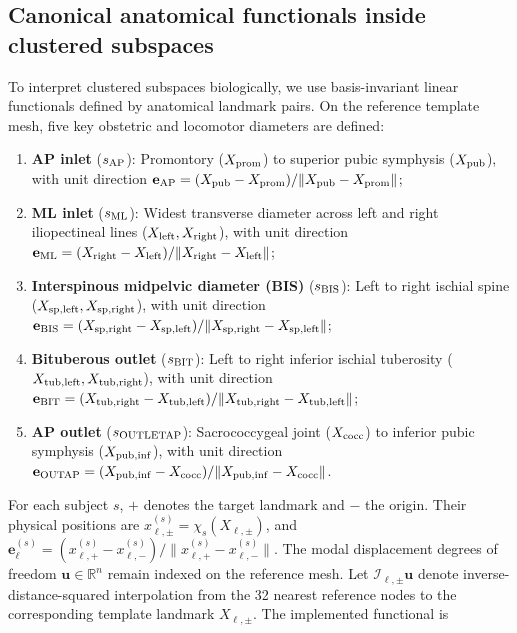 \documentclass[pdflatex,sn-basic]{sn-jnl}
\begin{document}
\subsection{Canonical anatomical functionals inside clustered subspaces}
\label{sec:canonical-methods}

To interpret clustered subspaces biologically, we use basis-invariant linear functionals defined by anatomical landmark pairs.
On the reference template mesh, five key obstetric and locomotor diameters are defined:
\begin{enumerate}[label=(\roman*)]
\item \textbf{AP inlet} ($s_{\rm AP}$): Promontory ($X_{\rm prom}$) to superior pubic symphysis ($X_{\rm pub}$), with unit direction $\mathbf e_{\rm AP} = (X_{\rm pub} - X_{\rm prom}) / \|X_{\rm pub} - X_{\rm prom}\|$;
\item \textbf{ML inlet} ($s_{\rm ML}$): Widest transverse diameter across left and right iliopectineal lines ($X_{\rm left}, X_{\rm right}$), with unit direction $\mathbf e_{\rm ML} = (X_{\rm right} - X_{\rm left}) / \|X_{\rm right} - X_{\rm left}\|$;
\item \textbf{Interspinous midpelvic diameter (BIS)} ($s_{\rm BIS}$): Left to right ischial spine ($X_{\rm sp,left}, X_{\rm sp,right}$), with unit direction $\mathbf e_{\rm BIS} = (X_{\rm sp,right} - X_{\rm sp,left}) / \|X_{\rm sp,right} - X_{\rm sp,left}\|$;
\item \textbf{Bituberous outlet} ($s_{\rm BIT}$): Left to right inferior ischial tuberosity ($X_{\rm tub,left}, X_{\rm tub,right}$), with unit direction $\mathbf e_{\rm BIT} = (X_{\rm tub,right} - X_{\rm tub,left}) / \|X_{\rm tub,right} - X_{\rm tub,left}\|$;
\item \textbf{AP outlet} ($s_{\rm OUTLETAP}$): Sacrococcygeal joint ($X_{\rm cocc}$) to inferior pubic symphysis ($X_{\rm pub,inf}$), with unit direction $\mathbf e_{\rm OUTAP} = (X_{\rm pub,inf} - X_{\rm cocc}) / \|X_{\rm pub,inf} - X_{\rm cocc}\|$.
\end{enumerate}
For each subject $s$, $+$ denotes the target landmark and $-$ the origin. Their physical positions are $x_{\ell,\pm}^{(s)}=\chi_s(X_{\ell,\pm})$, and $\mathbf e_\ell^{(s)}=(x_{\ell,+}^{(s)}-x_{\ell,-}^{(s)})/\|x_{\ell,+}^{(s)}-x_{\ell,-}^{(s)}\|$. The modal displacement degrees of freedom $\mathbf u\in\mathbb R^n$ remain indexed on the reference mesh. Let $\mathcal I_{\ell,\pm}\mathbf u$ denote inverse-distance-squared interpolation from the 32 nearest reference nodes to the corresponding template landmark $X_{\ell,\pm}$. The implemented functional is
\end{document}
